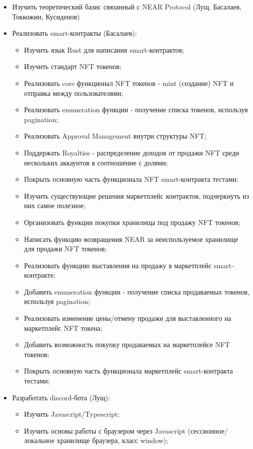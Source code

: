 \begin{itemize}
    \item Изучить теоретический базис связанный с NEAR Protocol (Лущ, Басалаев, Токкожин, Кусиденов)
    \item Реализовать smart-контракты (Басалаев):
    \begin{itemize}
        \item Изучить язык Rust для написания smart-контрактов;
        \item Изучить стандарт NFT токенов;
        \item Реализовать core функционал NFT токенов - mint (создание) NFT и отправка между пользователями;
        \item Реализовать enumeration функции - получение списка токенов, используя pagination;
        \item Реализовать Approval Management внутри структуры NFT;
        \item Поддержать Royalties - распределение доходов от продажи NFT среди нескольких аккаунтов в соотношение с долями;
        \item Покрыть основную часть функционала NFT smart-контракта тестами;
        \item Изучить существующие решения маркетплейс контрактов, подчеркнуть из них самое полезное;
        \item Организовать функции покупки хранилища под продажу NFT токенов;
        \item Написать функцию возвращения NEAR за неиспользуемое хранилище для продажи NFT токенов;
        \item Реализовать функцию выставления на продажу в маркетплейс smart-контракте;
        \item Добавить enumeration функции - получение списка продаваемых токенов, используя pagination;
        \item Реализовать изменение цены/отмену продажи для выставленного на маркетплейс NFT токена;
        \item Добавить возможность покупку продаваемых на маркетплейсе NFT токенов;
        \item Покрыть основную часть функционала маркетплейс smart-контракта тестами;
    \end{itemize}
    \item Разработать discord-бота (Лущ):
    \begin{itemize}
        \item Изучить Javascript/Typescript;
        \item Изучить основы работы с браузером через Javascript (сессионное/локальное хранилище браузера, класс window);

\end{itemize}
\end{itemize}
